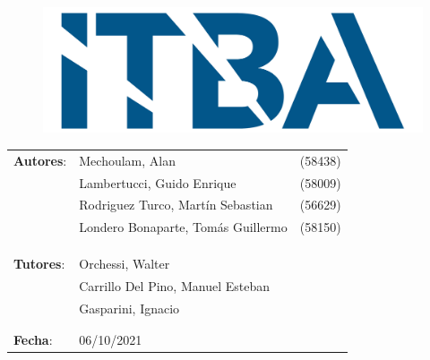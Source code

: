 \begin{titlepage}
\begin{figure}[H]
	\centering
	\includegraphics[width=0.5\linewidth]{./Utils/ITBA_2}
\end{figure}

\vspace*{1.5cm}

\center
{  }

\vspace*{1cm}

{ \textcolor{PName}{} }

\vspace*{3cm}

\begin{tabular}{llr} 	
\textbf{Autores}: & Mechoulam, Alan  &  (58438)\\
 & Lambertucci, Guido Enrique  & (58009) \\
 & Rodriguez Turco, Martín Sebastian  & (56629) \\
 & Londero Bonaparte, Tomás Guillermo  & (58150) \\
 &  & \\
 &  & \\
 &  & \\
\textbf{Tutores}: & Orchessi, Walter & \hspace*{4cm} \\
 & Carrillo Del Pino, Manuel Esteban & \hspace*{4cm} \\
 & Gasparini, Ignacio & \hspace*{4cm} \\
 &  & \\
 &  & \\
\textbf{Fecha}: & 06/10/2021 & \hspace*{4.5cm}\\
\end{tabular}

\end{titlepage}
